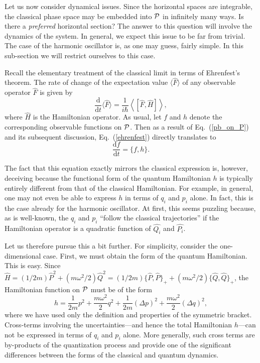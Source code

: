 \documentclass[12pt,aps,eqsecnum,tighten,nofootinbib]{revtex4-2}
\def\be{\begin{equation}}
\def\ee{\end{equation}}
\def\<{\langle}
\def\>{\rangle}
\def\d{{\mathrm d}}
\def\i{{i}}
\def\P{{\cal P}}
\def\w{\omega}
\newcommand{\eqn}[1]{Eq.~(\ref{#1})}
\begin{document}
Let us now consider dynamical issues.  Since the horizontal spaces are
integrable, the classical phase space may be embedded into $\P$ in
infinitely many ways.  Is there a {\em preferred} horizontal section?
The answer to this question will involve the dynamics of the system.
In general, we expect this issue to be far from trivial.  The case of
the harmonic oscillator is, as one may guess, fairly simple. In this
sub-section we will restrict ourselves to this case. 

Recall the elementary treatment of the classical limit in terms of
Ehrenfest's theorem.  The rate of change of the expectation value
$\< \hat{F} \>$ of any observable operator $\hat{F}$ is given by
%
\be \label{ehrenfest}
\frac{\d}{\d t} \< \hat{F} \> = \frac{1}{\i\hbar} 
\left<\left[ \hat{F}, \hat{H} \right] \right>,
\ee
%
where $\hat{H}$ is the Hamiltonian operator.  As usual, let $f$ and
$h$ denote the corresponding observable functions on $\P$.  Then as a
result of \eqn{pb_on_P} and its subsequent discussion, \eqn{ehrenfest}
directly translates to
%
\be
	\frac{\d f}{\d t} = \{ f, h \}.
\ee
%

The fact that this equation exactly mirrors the classical expression
is, however, deceiving because the functional form of the quantum
Hamiltonian $h$ is typically entirely different from that of the
classical Hamiltonian.  For example, in general, one may not even be
able to express $h$ in terms of $q_i$ and $p_i$ alone. In fact, this
is the case already for the harmonic oscillator. At first, this seems
puzzling because, as is well-known, the $q_i$ and $p_i$ ``follow the
classical trajectories'' if the Hamiltonian operator is a quadratic
function of $\hat{Q_i}$ and $\hat{P_i}$.

Let us therefore pursue this a bit further. For simplicity,
consider the one-dimensional case.  First, we must obtain the form of
the quantum Hamiltonian.  This is easy.  Since $ \hat{H} = (1 /
2m)\hat{P}^2 + (m\w^2 / 2)\hat{Q}^2 = (1 / 2m) \{ \hat{P}, \hat{P}
\}_+ + (m\w^2 / 2) \{ \hat{Q}, \hat{Q} \}_+$, the Hamiltonian function
on $\P$ must be of the form
%
\be h = \frac{1}{2m}p^2 + \frac{m\w^2}{2}q^2 +
\frac{1}{2m}(\Delta p)^2 + \frac{m\w^2}{2}(\Delta q)^2, \ee 
%
where we have used only the definition and properties of the symmetric
bracket.  Cross-terms involving the uncertainties---and hence the
total Hamiltonian $h$---can not be expressed in terms of $q_i$ and
$p_i$ alone. More generally, such cross terms are by-products of the
quantization process and provide one of the significant differences
between the forms of the classical and quantum dynamics.
\end{document}
